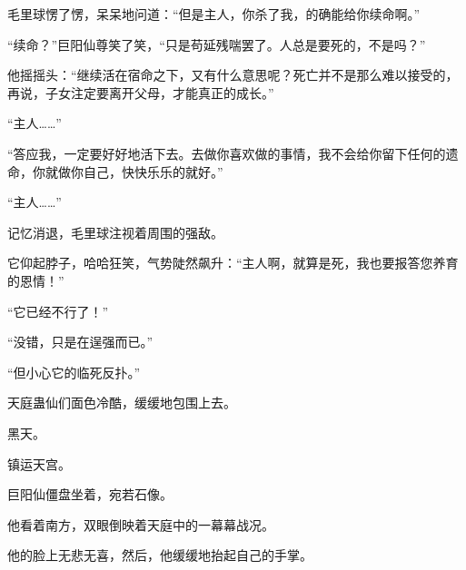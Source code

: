 \begin{this_body}
毛里球愣了愣，呆呆地问道：“但是主人，你杀了我，的确能给你续命啊。”

“续命？”巨阳仙尊笑了笑，“只是苟延残喘罢了。人总是要死的，不是吗？”

他摇摇头：“继续活在宿命之下，又有什么意思呢？死亡并不是那么难以接受的，再说，子女注定要离开父母，才能真正的成长。”

“主人……”

“答应我，一定要好好地活下去。去做你喜欢做的事情，我不会给你留下任何的遗命，你就做你自己，快快乐乐的就好。”

“主人……”

记忆消退，毛里球注视着周围的强敌。

它仰起脖子，哈哈狂笑，气势陡然飙升：“主人啊，就算是死，我也要报答您养育的恩情！”

“它已经不行了！”

“没错，只是在逞强而已。”

“但小心它的临死反扑。”

天庭蛊仙们面色冷酷，缓缓地包围上去。

黑天。

镇运天宫。

巨阳仙僵盘坐着，宛若石像。

他看着南方，双眼倒映着天庭中的一幕幕战况。

他的脸上无悲无喜，然后，他缓缓地抬起自己的手掌。

\end{this_body}

